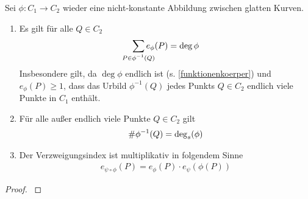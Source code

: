\begin{Satz}\label{sepgrad}
  Sei $\phi\colon C_1\to C_2$ wieder eine nicht-konstante Abbildung
  zwischen glatten Kurven. 
  \begin{enumerate}[label=\roman*)]
    \item Es gilt für alle $Q\in C_2$
      \begin{gather*}
        \sum_{\mathclap{P\in\phi^{-1}(Q)}} e_\phi(P) = \deg\phi
      \end{gather*}
      Insbesondere gilt, da $\deg\phi$ endlich ist
      (s. \ref{funktionenkoerper}) und $e_\phi(P)\geq 1$,
      dass das Urbild $\phi^{-1}(Q)$ jedes Punkts $Q\in C_2$
      endlich viele Punkte in $C_1$ enthält.
    \item Für alle außer endlich viele Punkte $Q\in C_2$ gilt
      \begin{gather*}
        \#\phi^{-1}(Q) = \operatorname{\deg}_s(\phi)
      \end{gather*}
    \item Der Verzweigungsindex ist multiplikativ
      in folgendem Sinne
      \begin{gather*}
        e_{\psi\circ\phi}(P) = e_\phi(P) \cdot e_\psi(\phi(P))
      \end{gather*}
    \end{enumerate}
    \begin{proof}
      \cite[siehe][Proposition II.2.6]{silverman}
      


\end{proof}
\end{Satz}
